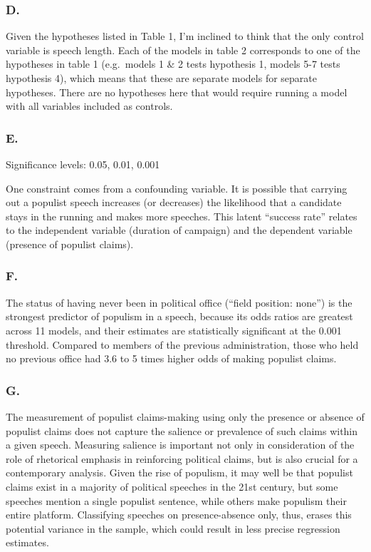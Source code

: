 \documentclass[
  letterpaper,
  DIV=11,
  numbers=noendperiod]{scrartcl}
\begin{document}
\subsubsection{D.}\label{d.-1}

Given the hypotheses listed in Table 1, I'm inclined to think that the
only control variable is speech length. Each of the models in table 2
corresponds to one of the hypotheses in table 1 (e.g.~models 1 \& 2
tests hypothesis 1, models 5-7 tests hypothesis 4), which means that
these are separate models for separate hypotheses. There are no
hypotheses here that would require running a model with all variables
included as controls.

\subsubsection{E.}\label{e.-1}

Significance levels: 0.05, 0.01, 0.001

One constraint comes from a confounding variable. It is possible that
carrying out a populist speech increases (or decreases) the likelihood
that a candidate stays in the running and makes more speeches. This
latent ``success rate'' relates to the independent variable (duration of
campaign) and the dependent variable (presence of populist claims).

\subsubsection{F.}\label{f.}

The status of having never been in political office (``field position:
none'') is the strongest predictor of populism in a speech, because its
odds ratios are greatest across 11 models, and their estimates are
statistically significant at the 0.001 threshold. Compared to members of
the previous administration, those who held no previous office had 3.6
to 5 times higher odds of making populist claims.

\subsubsection{G.}\label{g.}

The measurement of populist claims-making using only the presence or
absence of populist claims does not capture the salience or prevalence
of such claims within a given speech. Measuring salience is important
not only in consideration of the role of rhetorical emphasis in
reinforcing political claims, but is also crucial for a contemporary
analysis. Given the rise of populism, it may well be that populist
claims exist in a majority of political speeches in the 21st century,
but some speeches mention a single populist sentence, while others make
populism their entire platform. Classifying speeches on presence-absence
only, thus, erases this potential variance in the sample, which could
result in less precise regression estimates.
\end{document}
